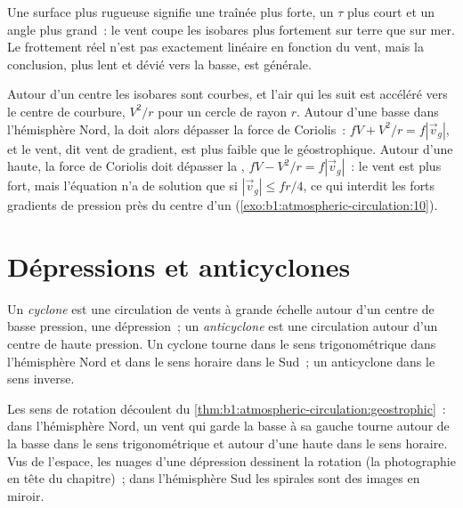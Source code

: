 Une surface plus rugueuse signifie une traînée plus forte, un $\tau$ plus court et un angle plus grand~:
le vent coupe les isobares plus fortement sur terre que sur mer. Le frottement réel
n'est pas exactement linéaire en fonction du vent, mais la conclusion, plus lent et dévié vers
la basse, est générale.

\begin{remark}\label{rem:b1:atmospheric-circulation:gradient}
Autour d'un centre les isobares sont courbes, et l'air qui les suit est accéléré
vers le centre de courbure, $V^2/r$ pour un cercle de rayon $r$. Autour d'une basse dans
l'hémisphère Nord, la  doit alors dépasser la force de
Coriolis~: $fV + V^2/r = f|\vec v_g|$, et le vent, dit vent de gradient, est
plus faible que le géostrophique. Autour d'une haute, la force de Coriolis doit dépasser la
, $fV - V^2/r = f|\vec v_g|$~: le vent est plus fort, mais
l'équation n'a de solution que si $|\vec v_g| \leq fr/4$, ce qui interdit les forts gradients
de pression près du centre d'un  (\cref{exo:b1:atmospheric-circulation:10}).
\end{remark}

\section{Dépressions et anticyclones}\label{sec:b1:atmospheric-circulation:cyclones}

\begin{definition}\label{def:b1:atmospheric-circulation:cyclone}
Un \emph{cyclone} est une circulation de vents à grande échelle autour d'un centre
de basse pression, une dépression~; un \emph{anticyclone} est une
circulation autour d'un centre de haute pression. Un cyclone tourne dans le sens trigonométrique dans
l'hémisphère Nord et dans le sens horaire dans le Sud~; un anticyclone dans le sens inverse.
\end{definition}

Les sens de rotation découlent du \cref{thm:b1:atmospheric-circulation:geostrophic}~:
dans l'hémisphère Nord, un vent qui garde la basse à sa gauche tourne autour de la basse
dans le sens trigonométrique et autour d'une haute dans le sens horaire. Vus de l'espace, les nuages d'une
dépression dessinent la rotation (la photographie en tête du chapitre)~; dans
l'hémisphère Sud les spirales sont des images en miroir.

